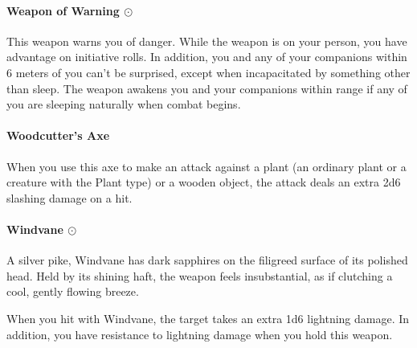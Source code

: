     \paragraph{Weapon of Warning $\odot$}
        This weapon warns you of danger.
        While the weapon is on your person, you have advantage on initiative rolls.
        In addition, you and any of your companions within 6 meters of you can't be surprised, except when incapacitated by something other than sleep.
        The weapon awakens you and your companions within range if any of you are sleeping naturally when combat begins.
    \paragraph{Woodcutter's Axe}
        When you use this axe to make an attack against a plant (an ordinary plant or a creature with the Plant type) or a wooden object, the attack deals an extra 2d6 slashing damage on a hit.
    \paragraph{Windvane $\odot$}
        A silver pike, Windvane has dark sapphires on the filigreed surface of its polished head.
        Held by its shining haft, the weapon feels insubstantial, as if clutching a cool, gently flowing breeze.

        When you hit with Windvane, the target takes an extra 1d6 lightning damage.
        In addition, you have resistance to lightning damage when you hold this weapon.


